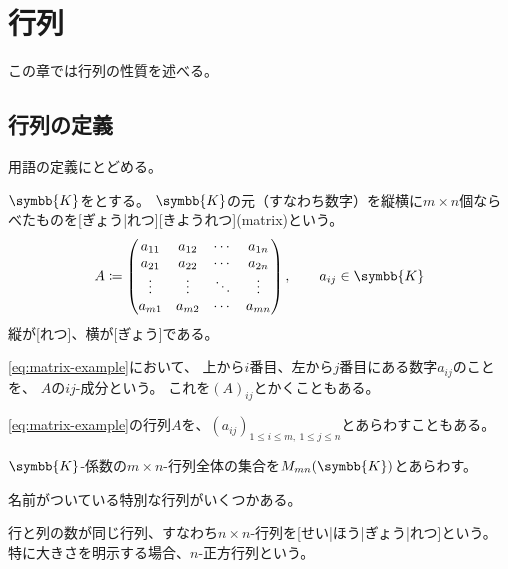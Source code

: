 \documentclass[../sotsu.tex]{subfiles}
\begin{document}
\section{行列}
\label{sec:matrix}

この章では行列の性質を述べる。

\subsection{行列の定義}

用語の定義にとどめる。

\begin{definition}[行列]
    $\symbb{K}$をとする。
    $\symbb{K}$の元（すなわち数字）を縦横に$m \times n$個ならべたものを[ぎょう|れつ][きようれつ](matrix)という。
    \begin{equation}
        \label{eq:matrix-example}
        A \coloneq 
        \begin{pmatrix}
            a_{11}  &  a_{12}  &  \cdots  &  a_{1n}  \\
            a_{21}  &  a_{22}  &  \cdots  &  a_{2n}  \\
            \vdots  &  \vdots  &  \ddots  &  \vdots  \\
            a_{m1}  &  a_{m2}  &  \cdots  &  a_{mn}
        \end{pmatrix}
        , \qquad 
        a_{ij} \in \symbb{K}
    \end{equation}
    縦が[れつ]、横が[ぎょう]である。

    \cref{eq:matrix-example}において、
    上から$i$番目、左から$j$番目にある数字$a_{ij}$のことを、
    $A$の$ij$-成分という。
    これを$(A)_{ij}$とかくこともある。
\end{definition}

\cref{eq:matrix-example}の行列$A$を、$(a_{ij})_{1 \leq i \leq m, \  1 \leq j \leq n}$とあらわすこともある。

\begin{definition}
    \label{dfn:set-of-matrix}
    $\symbb{K}$-係数の$m \times n$-行列全体の集合を$M_{mn}(\symbb{K})$とあらわす。
\end{definition}

名前がついている特別な行列がいくつかある。

\begin{definition}[正方行列]
    行と列の数が同じ行列、すなわち$n \times n$-行列を[せい|ほう|ぎょう|れつ]という。
    特に大きさを明示する場合、$n$-正方行列という。
\end{definition}
\end{document}
